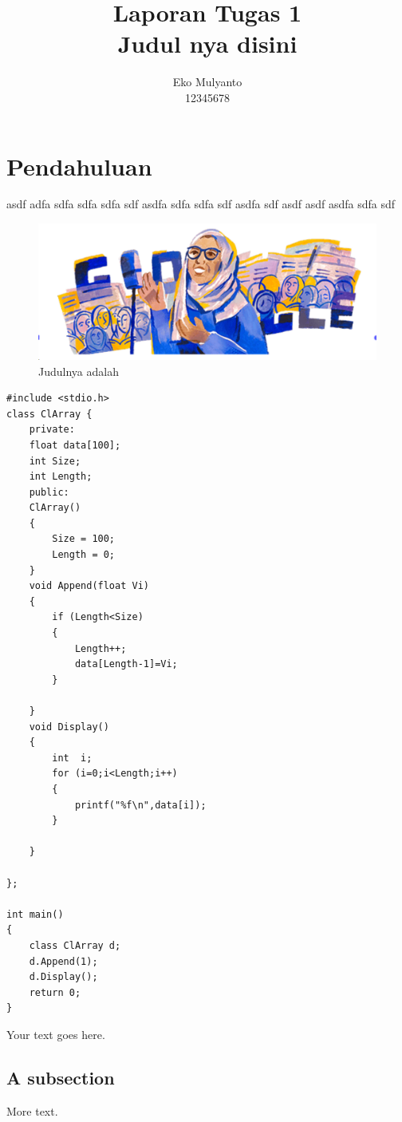 \documentclass[11pt]{article} %
\title{Laporan Tugas 1\\Judul nya disini}
\author{Eko Mulyanto\\12345678}
\begin{document}
	\maketitle
	
\section{Pendahuluan}
asdf adfa sdfa sdfa sdfa sdf asdfa sdfa sdfa sdf asdfa sdf asdf asdf asdfa sdfa sdf
\begin{figure}[h!]
	\centering
	\includegraphics[width=1\linewidth]{screenshot001}
	\caption{Judulnya adalah }
	\label{fig:screenshot001}
\end{figure}

\begin{lstlisting}
#include <stdio.h>
class ClArray {
	private:
	float data[100];
	int Size;
	int Length;
	public:
	ClArray()
	{
		Size = 100;
		Length = 0;
	}
	void Append(float Vi)
	{
		if (Length<Size)
		{
			Length++;
			data[Length-1]=Vi;
		}
		
	}
	void Display() 
	{
		int  i;
		for (i=0;i<Length;i++)
		{
			printf("%f\n",data[i]);
		}
		
	}
	
};

int main()
{
	class ClArray d;
	d.Append(1);
	d.Display();
	return 0;
}

\end{lstlisting}
		
		Your text goes here.
		
		\subsection{A subsection}
		
		More text.
		
	
\end{document}
